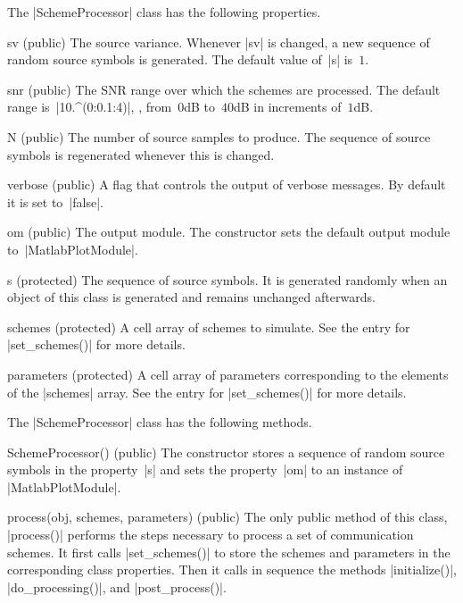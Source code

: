 The |SchemeProcessor| class has the following properties.
\begin{property}{sv (public)}
The source variance. Whenever |sv| is changed, a new sequence of
  random source symbols is generated. The default value of~|s| is~$1$.
\end{property}
\begin{property}{snr (public)}
The SNR range over which the schemes are processed. The default range
is~|10.^(0:0.1:4)|, \ie, from~$0$dB to~$40$dB in increments of~$1$dB.
\end{property}
\begin{property}{N (public)}
The number of source samples to produce. The sequence of source symbols is
regenerated whenever this is changed. 
\end{property}
\begin{property}{verbose (public)}
A flag that controls the output of verbose messages. By default it is set
to~|false|.
\end{property}
\begin{property}{om (public)}
The output module. The constructor sets the default output module
to~|MatlabPlotModule|.
\end{property}
\begin{property}{s (protected)}
The sequence of source symbols. It is generated randomly when an object of this
class is generated and remains unchanged afterwards. 
\end{property}
\begin{property}{schemes (protected)}
A cell array of schemes to simulate. See the entry for |set_schemes()| for more
details. 
\end{property}
\begin{property}{parameters (protected)}
A cell array of parameters corresponding to the elements of the |schemes| array.
See the entry for |set_schemes()| for more details.
\end{property}

The |SchemeProcessor| class has the following methods.
\begin{method}{SchemeProcessor() (public)}
  The constructor stores a sequence of random source
  symbols in the property~|s| and sets the property~|om| to an instance of
  |MatlabPlotModule|. 
\end{method}
\begin{method}{process(obj, schemes, parameters) (public)}
  The only public method of this class,
  |process()| performs the steps necessary to process a set of communication
  schemes. It first calls |set_schemes()| to store the schemes and parameters
  in the corresponding class properties. Then it calls in sequence the
  methods |initialize()|, |do_processing()|, and |post_process()|.
\end{method}

